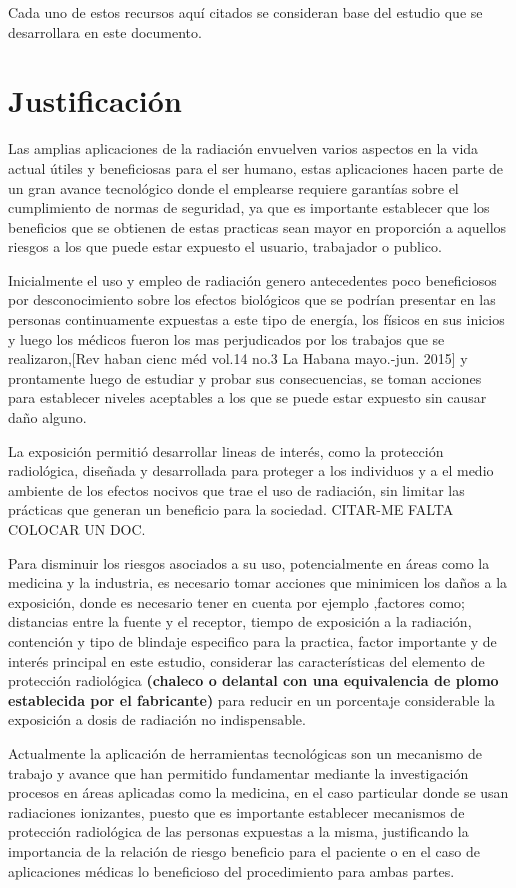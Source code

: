 \documentclass[a4paper,10pt]{article}
\begin{document}
Cada uno de estos recursos aquí citados se consideran base del estudio que se desarrollara en este documento.

\section{Justificación}

Las amplias aplicaciones de la radiación envuelven varios aspectos en la vida actual útiles y beneficiosas para el ser humano, estas aplicaciones hacen parte de un gran avance tecnológico donde el emplearse requiere garantías sobre el cumplimiento de normas de seguridad, ya que es importante establecer que los beneficios que se obtienen de estas practicas sean mayor en proporción a aquellos riesgos a los que puede estar expuesto el usuario, trabajador o publico.

Inicialmente el uso y empleo de radiación genero antecedentes poco beneficiosos por desconocimiento sobre los efectos biológicos que se podrían presentar en las personas continuamente  expuestas a este tipo de energía, los físicos en sus inicios y luego los médicos fueron los mas perjudicados por los trabajos que se realizaron,[Rev haban cienc méd vol.14 no.3 La Habana mayo.-jun. 2015] y prontamente luego de estudiar y probar sus consecuencias, se toman acciones para establecer niveles aceptables a los que se puede estar expuesto sin causar daño alguno.


La exposición permitió desarrollar lineas de interés, como la protección radiológica, diseñada y desarrollada para proteger a los individuos y a el medio ambiente de los efectos nocivos que trae el uso de  radiación,  sin limitar las prácticas que generan un beneficio para la sociedad. CITAR-ME FALTA COLOCAR UN DOC.

Para disminuir los riesgos asociados a su uso, potencialmente en áreas como  la medicina y la industria, es necesario  tomar acciones que minimicen los daños a la exposición, donde  es necesario tener en cuenta por ejemplo ,factores como; distancias entre la fuente y el receptor, tiempo de exposición a la radiación, contención y tipo de blindaje especifico para la practica, factor importante y de interés principal en este estudio, considerar las características del elemento de protección radiológica \textbf{(chaleco o delantal con una equivalencia de plomo establecida por el fabricante)} para reducir en un porcentaje considerable la exposición a dosis de radiación no indispensable.     

Actualmente la aplicación de herramientas tecnológicas son un mecanismo de trabajo y avance que han permitido fundamentar mediante la investigación procesos en áreas  aplicadas como la medicina, en el caso particular donde se usan radiaciones ionizantes, puesto que es importante establecer mecanismos de  protección  radiológica  de  las  personas expuestas a la misma, justificando la importancia de la relación de riesgo beneficio para el paciente o en el caso de aplicaciones médicas lo beneficioso del procedimiento para ambas partes.
\end{document}
